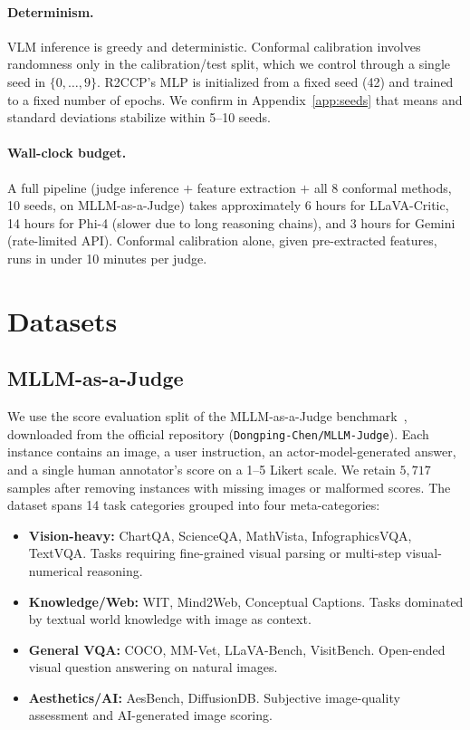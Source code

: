\documentclass{article}
\begin{document}
\paragraph{Determinism.} VLM inference is greedy and deterministic. Conformal calibration involves randomness only in the calibration/test split, which we control through a single seed in $\{0,\dots,9\}$. R2CCP's MLP is initialized from a fixed seed (42) and trained to a fixed number of epochs. We confirm in Appendix~\ref{app:seeds} that means and standard deviations stabilize within 5--10 seeds.

\paragraph{Wall-clock budget.} A full pipeline (judge inference $+$ feature extraction $+$ all 8 conformal methods, 10 seeds, on MLLM-as-a-Judge) takes approximately 6 hours for LLaVA-Critic, 14 hours for Phi-4 (slower due to long reasoning chains), and 3 hours for Gemini (rate-limited API). Conformal calibration alone, given pre-extracted features, runs in under 10 minutes per judge.

\section{Datasets}
\label{app:datasets_full}

\subsection{MLLM-as-a-Judge}

We use the score evaluation split of the MLLM-as-a-Judge benchmark~\citep{chen2024mllmasajudge}, downloaded from the official repository (\texttt{Dongping-Chen/MLLM-Judge}). Each instance contains an image, a user instruction, an actor-model-generated answer, and a single human annotator's score on a 1--5 Likert scale. We retain $5{,}717$ samples after removing instances with missing images or malformed scores. The dataset spans 14 task categories grouped into four meta-categories:

\begin{itemize}[leftmargin=14pt,itemsep=1pt,topsep=2pt]
\item \textbf{Vision-heavy:} ChartQA, ScienceQA, MathVista, InfographicsVQA, TextVQA. Tasks requiring fine-grained visual parsing or multi-step visual-numerical reasoning.
\item \textbf{Knowledge/Web:} WIT, Mind2Web, Conceptual Captions. Tasks dominated by textual world knowledge with image as context.
\item \textbf{General VQA:} COCO, MM-Vet, LLaVA-Bench, VisitBench. Open-ended visual question answering on natural images.
\item \textbf{Aesthetics/AI:} AesBench, DiffusionDB. Subjective image-quality assessment and AI-generated image scoring.
\end{itemize}
\end{document}
